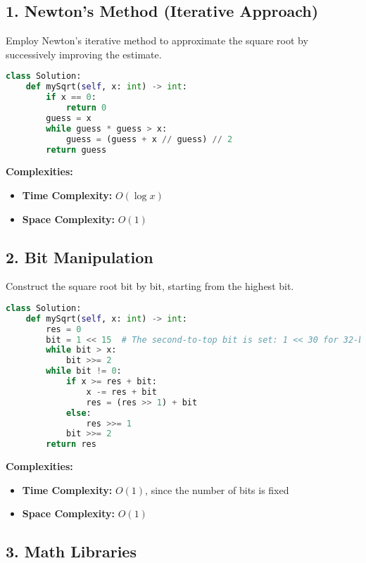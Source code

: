 \subsection*{1. Newton's Method (Iterative Approach)}

Employ Newton's iterative method to approximate the square root by successively improving the estimate.

\begin{lstlisting}[language=Python]
class Solution:
    def mySqrt(self, x: int) -> int:
        if x == 0:
            return 0
        guess = x
        while guess * guess > x:
            guess = (guess + x // guess) // 2
        return guess
\end{lstlisting}

\textbf{Complexities:}
\begin{itemize}
    \item \textbf{Time Complexity:} \(O(\log x)\)
    \item \textbf{Space Complexity:} \(O(1)\)
\end{itemize}

\subsection*{2. Bit Manipulation}

Construct the square root bit by bit, starting from the highest bit.

\begin{lstlisting}[language=Python]
class Solution:
    def mySqrt(self, x: int) -> int:
        res = 0
        bit = 1 << 15  # The second-to-top bit is set: 1 << 30 for 32-bit
        while bit > x:
            bit >>= 2
        while bit != 0:
            if x >= res + bit:
                x -= res + bit
                res = (res >> 1) + bit
            else:
                res >>= 1
            bit >>= 2
        return res
\end{lstlisting}

\textbf{Complexities:}
\begin{itemize}
    \item \textbf{Time Complexity:} \(O(1)\), since the number of bits is fixed
    \item \textbf{Space Complexity:} \(O(1)\)
\end{itemize}

\subsection*{3. Math Libraries}

